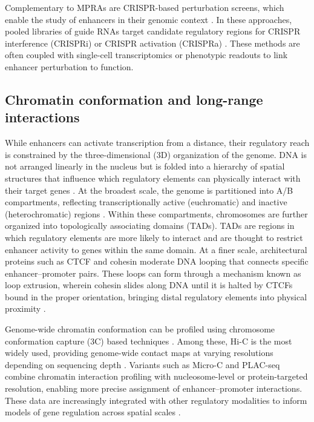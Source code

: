 \begin{dissertationintroduction}
Complementary to MPRAs are CRISPR-based perturbation screens, which enable the study of enhancers in their genomic context \cite{Cong2013-ib,Mali2013-gw}. In these approaches, pooled libraries of guide RNAs target candidate regulatory regions for CRISPR interference (CRISPRi) \cite{Gasperini2019-bs} or CRISPR activation (CRISPRa) \cite{Chardon2024-jy}. These methods are often coupled with single-cell transcriptomics or phenotypic readouts to link enhancer perturbation to function.

\subsection{Chromatin conformation and long-range interactions}

While enhancers can activate transcription from a distance, their regulatory reach is constrained by the three-dimensional (3D) organization of the genome. DNA is not arranged linearly in the nucleus but is folded into a hierarchy of spatial structures that influence which regulatory elements can physically interact with their target genes \cite{Zheng2019-ld}. At the broadest scale, the genome is partitioned into A/B compartments, reflecting transcriptionally active (euchromatic) and inactive (heterochromatic) regions \cite{Dixon2012-rp}. Within these compartments, chromosomes are further organized into topologically associating domains (TADs). TADs are regions in which regulatory elements are more likely to interact \cite{Rodriguez-Carballo2017-lh} and are thought to restrict enhancer activity to genes within the same domain. At a finer scale, architectural proteins such as CTCF and cohesin \cite{Merkenschlager2016-hx} moderate DNA looping that connects specific enhancer–promoter pairs. These loops can form through a mechanism known as loop extrusion, wherein cohesin slides along DNA until it is halted by CTCFs bound in the proper orientation, bringing distal regulatory elements into physical proximity \cite{Fudenberg2017-wd}.

Genome-wide chromatin conformation can be profiled using chromosome conformation capture (3C) based techniques \cite{Lieberman-Aiden2009-tc}. Among these, Hi-C is the most widely used, providing genome-wide contact maps at varying resolutions depending on sequencing depth \cite{Belton2012-yi}. Variants such as Micro-C \cite{Hsieh2015-ao} and PLAC-seq \cite{Yu2021-nv} combine chromatin interaction profiling with nucleosome-level or protein-targeted resolution, enabling more precise assignment of enhancer–promoter interactions. These data are increasingly integrated with other regulatory modalities to inform models of gene regulation across spatial scales \cite{Pal2019-so}.


\end{dissertationintroduction}
